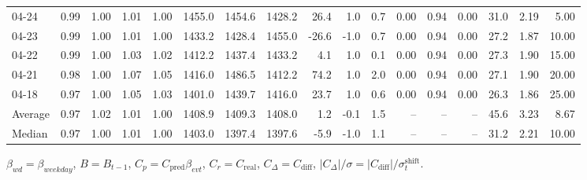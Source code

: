 \begin{threeparttable}
{\begin{tabular}{lrrrrrrrrrrrrrrrr}
  04-24 &         0.99 &           1.00 &          1.01 &          1.00 & 1455.0 & 1454.6 & 1428.2 &       26.4 &                      1.0 &                 0.7 &       0.00 &      0.94 &           0.00 &             31.0 &            2.19 &                   5.00 \\
  04-23 &         0.99 &           1.00 &          1.01 &          1.00 & 1433.2 & 1428.4 & 1455.0 &      -26.6 &                     -1.0 &                 0.7 &       0.00 &      0.94 &           0.00 &             27.2 &            1.87 &                  10.00 \\
  04-22 &         0.99 &           1.00 &          1.03 &          1.02 & 1412.2 & 1437.4 & 1433.2 &        4.1 &                      1.0 &                 0.1 &       0.00 &      0.94 &           0.00 &             27.3 &            1.90 &                  15.00 \\
  04-21 &         0.98 &           1.00 &          1.07 &          1.05 & 1416.0 & 1486.5 & 1412.2 &       74.2 &                      1.0 &                 2.0 &       0.00 &      0.94 &           0.00 &             27.1 &            1.90 &                  20.00 \\
  04-18 &         0.97 &           1.00 &          1.05 &          1.03 & 1401.0 & 1439.7 & 1416.0 &       23.7 &                      1.0 &                 0.6 &       0.00 &      0.94 &           0.00 &             26.3 &            1.86 &                  25.00 \\
Average &         0.97 &           1.02 &          1.01 &          1.00 & 1408.9 & 1409.3 & 1408.0 &        1.2 &                     -0.1 &                 1.5 &         -- &        -- &             -- &             45.6 &            3.23 &                   8.67 \\
 Median &         0.97 &           1.00 &          1.01 &          1.00 & 1403.0 & 1397.4 & 1397.6 &       -5.9 &                     -1.0 &                 1.1 &         -- &        -- &             -- &             31.2 &            2.21 &                  10.00 \\
\bottomrule
\end{tabular}
}
\begin{tablenotes}\footnotesize
\item $\beta_{wd}=\beta_{weekday}$, $B=B_{t-1}$,
$C_p=C_{\text{pred}}\beta_{evt}$, $C_r=C_{\text{real}}$,
$C_\Delta=C_{\text{diff}}$, $|C_\Delta|/\sigma=|C_{\text{diff}}|/\sigma_t^{\text{shift}}$.
\end{tablenotes}
\end{threeparttable}
\endgroup
